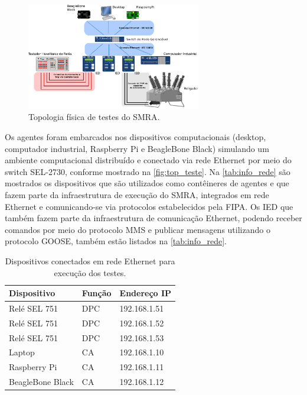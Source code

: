 \documentclass[journal]{IEEEtran}
\begin{document}
\begin{figure}[htb]
    \centering
    \includegraphics[width=3.0in]{Figuras/topologia_de_testes.eps}
    \caption{\label{fig:top_teste} Topologia física de testes do SMRA.}    
\end{figure}

Os agentes foram embarcados nos dispositivos computacionais (desktop, computador industrial, Raspberry Pi e BeagleBone Black) simulando um ambiente computacional distribuído e conectado via rede Ethernet por meio do switch SEL-2730, conforme mostrado na \autoref{fig:top_teste}. Na \autoref{tab:info_rede} são mostrados os dispositivos que são utilizados como contêineres de agentes e que fazem parte da infraestrutura de execução do SMRA, integrados em rede Ethernet e comunicando-se via protocolos estabelecidos pela FIPA. Os IED que também fazem parte da infraestrutura de comunicação Ethernet, podendo receber comandos por meio do protocolo MMS e publicar mensagens utilizando o protocolo GOOSE, também estão listados na \autoref{tab:info_rede}.

\begin{table}[htb]
    \centering
    \caption{\label{tab:info_rede} Dispositivos conectados em rede Ethernet para execução dos testes.}
    \begin{tabular}{p{1.0in}p{0.5in}p{1.0in}}
        \toprule
        Dispositivo & Função & Endereço IP \\[0.1in]
        \midrule
        \midrule
        Relé SEL 751 & DPC & 192.168.1.51 \\
        \midrule
        Relé SEL 751 & DPC & 192.168.1.52 \\
        \midrule
        Relé SEL 751 & DPC & 192.168.1.53 \\
        \midrule
        Laptop & CA & 192.168.1.10 \\
        \midrule
        Raspberry Pi & CA & 192.168.1.11 \\
        \midrule
        BeagleBone Black & CA & 192.168.1.12 \\
        \bottomrule
    \end{tabular}
    \\[0.1in]
\end{table}
\end{document}

